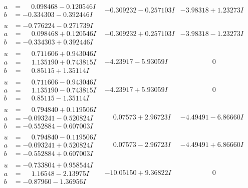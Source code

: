 \documentclass[1p]{elsarticle_modified}
\theoremstyle{definition}
\begin{document}
$$\begin{array}{c|c|c}
\begin{aligned}
a &= \phantom{-}0.098468 - 0.120546 I \\
b &= -0.334303 - 0.392446 I\end{aligned}
 & -0.309232 - 0.257103 I & -3.98318 + 1.23273 I \\ \hline\begin{aligned}
u &= -0.776224 - 0.271739 I \\
a &= \phantom{-}0.098468 + 0.120546 I \\
b &= -0.334303 + 0.392446 I\end{aligned}
 & -0.309232 + 0.257103 I & -3.98318 - 1.23273 I \\ \hline\begin{aligned}
u &= \phantom{-}0.711606 + 0.943046 I \\
a &= \phantom{-}1.135190 + 0.743815 I \\
b &= \phantom{-}0.85115 + 1.35114 I\end{aligned}
 & -4.23917 - 5.93059 I & \phantom{-0.000000 } 0 \\ \hline\begin{aligned}
u &= \phantom{-}0.711606 - 0.943046 I \\
a &= \phantom{-}1.135190 - 0.743815 I \\
b &= \phantom{-}0.85115 - 1.35114 I\end{aligned}
 & -4.23917 + 5.93059 I & \phantom{-0.000000 } 0 \\ \hline\begin{aligned}
u &= \phantom{-}0.794840 + 0.119506 I \\
a &= -0.093241 - 0.520824 I \\
b &= -0.552884 - 0.607003 I\end{aligned}
 & \phantom{-}0.07573 + 2.96723 I & -4.49491 - 6.86660 I \\ \hline\begin{aligned}
u &= \phantom{-}0.794840 - 0.119506 I \\
a &= -0.093241 + 0.520824 I \\
b &= -0.552884 + 0.607003 I\end{aligned}
 & \phantom{-}0.07573 - 2.96723 I & -4.49491 + 6.86660 I \\ \hline\begin{aligned}
u &= -0.733804 + 0.958544 I \\
a &= \phantom{-}1.16548 - 2.13975 I \\
b &= -0.87960 - 1.36956 I\end{aligned}
 & -10.05150 + 9.36822 I & \phantom{-0.000000 } 0 \\ \hline\begin{aligned}

\end{aligned}
\end{array}$$
\end{document}
